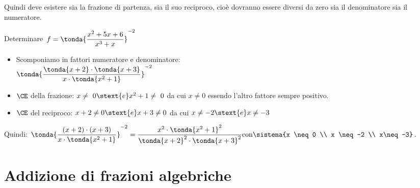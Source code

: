 Quindi deve esistere sia la frazione di partenza, sia il suo reciproco, cioè 
dovranno essere diversi da zero sia il denominatore sia il numeratore.

\begin{esempio}{}{}
Determinare~\(f = \tonda{\dfrac{x^{2}+5x+6}{x^{3}+x}} ^{-2}\)
\begin{itemize}[nosep]
\item Scomponiamo in fattori numeratore e denominatore: \\
\( \tonda{\dfrac{ \tonda{x+2} \cdot  \tonda{x+3} }
                          {x\cdot  \tonda{x^{2}+1} }} ^{-2}\)
\item \(\CE\) della frazione: \(x\neq~0 \stext{e} x^2+1\neq~0\) da cui
\(x \neq 0\) essendo l'altro fattore sempre positivo.
\item \(\CE\) del reciproco: \(x+2 \neq 0 \stext{e} x+3 \neq 0\) da cui 
\(x \neq -2 \stext{e} x \neq -3\)
\end{itemize}
Quindi:
\(\tonda{\dfrac{(x+2)\cdot (x+3)}{x\cdot  \tonda{x^2+1} }}^{-2}=
\dfrac{x^2 \cdot \tonda{x^2+1}^2}{\tonda{x+2}^{2} \cdot \tonda{x+3}^2}
\text{con} \sistema{x \neq 0 \\ x \neq -2 \\ x\neq-3}\).
\end{esempio}


\section{Addizione di frazioni algebriche}
\label{sec:frazalg_addizione}


